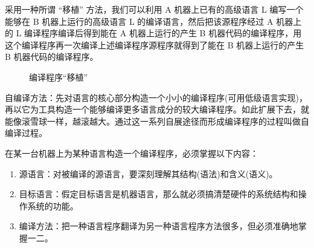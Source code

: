 采用一种所谓 ``移植'' 方法，我们可以利用 A 机器上已有的高级语言 L 编写一个能够在 B 机器上运行的高级语言 L 的编译语言，然后把该源程序经过 A 机器上的 L 编译程序编译后得到能在 A 机器上运行的产生 B 机器代码的编译程序，用这个编译程序再一次编译上述编译程序源程序就得到了能在 B 机器上运行的产生 B 机器代码的编译程序。

\begin{figure}[H]
    \centering
    \caption{编译程序``移植''}
    \label{编译程序``移植''}
\end{figure}

自编译方法：先对语言的核心部分构造一个小小的编译程序(可用低级语言实现)，再以它为工具构造一个能够编译更多语言成分的较大编译程序。如此扩展下去，就能像滚雪球一样，越滚越大。通过这一系列自展途径而形成编译程序的过程叫做自编译过程。

在某一台机器上为某种语言构造一个编译程序，必须掌握以下内容：
\begin{enumerate}
    \item 源语言：对被编译的源语言，要深刻理解其结构(语法)和含义(语义)。
    \item 目标语言：假定目标语言是机器语言，那么就必须搞清楚硬件的系统结构和操作系统的功能。
    \item 编译方法：把一种语言程序翻译为另一种语言程序方法很多，但必须准确地掌握一二。
\end{enumerate}